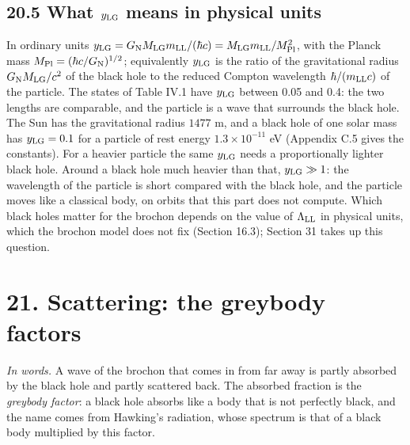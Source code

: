 \documentclass[
  10pt,
]{article}
\begin{document}
\hypertarget{what-y_rm-lg-means-in-physical-units}{%
\subsection{\texorpdfstring{20.5 What \(y_{\rm LG}\) means in physical
units}{20.5 What y\_\{\textbackslash rm LG\} means in physical units}}\label{what-y_rm-lg-means-in-physical-units}}

In ordinary units
\(y_{\rm LG}=G_{\rm N}M_{\rm LG}m_{\rm LL}/(\hbar c)=M_{\rm LG}m_{\rm LL}/M_{\rm Pl}^2\),
with the Planck mass \(M_{\rm Pl}=(\hbar c/G_{\rm N})^{1/2}\);
equivalently \(y_{\rm LG}\) is the ratio of the gravitational radius
\(G_{\rm N}M_{\rm LG}/c^2\) of the black hole to the reduced Compton
wavelength \(\hbar/(m_{\rm LL}c)\) of the particle. The states of Table
IV.1 have \(y_{\rm LG}\) between 0.05 and 0.4: the two lengths are
comparable, and the particle is a wave that surrounds the black hole.
The Sun has the gravitational radius \(1477\) m, and a black hole of one
solar mass has \(y_{\rm LG}=0.1\) for a particle of rest energy
\(1.3\times10^{-11}\) eV (Appendix C.5 gives the constants). For a
heavier particle the same \(y_{\rm LG}\) needs a proportionally lighter
black hole. Around a black hole much heavier than that,
\(y_{\rm LG}\gg1\): the wavelength of the particle is short compared
with the black hole, and the particle moves like a classical body, on
orbits that this part does not compute. Which black holes matter for the
brochon depends on the value of \(\Lambda_{\rm LL}\) in physical units,
which the brochon model does not fix (Section 16.3); Section 31 takes up
this question.

\hypertarget{scattering-the-greybody-factors}{%
\section{21. Scattering: the greybody
factors}\label{scattering-the-greybody-factors}}

\emph{In words.} A wave of the brochon that comes in from far away is
partly absorbed by the black hole and partly scattered back. The
absorbed fraction is the \emph{greybody factor}: a black hole absorbs
like a body that is not perfectly black, and the name comes from
Hawking's radiation, whose spectrum is that of a black body multiplied
by this factor.
\end{document}

